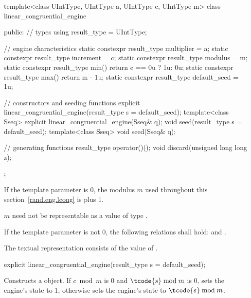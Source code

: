 %
\begin{codeblock}
template<class UIntType, UIntType a, UIntType c, UIntType m>
 class linear_congruential_engine
{
public:
 // types
 using result_type = UIntType;

 // engine characteristics
 static constexpr result_type multiplier = a;
 static constexpr result_type increment = c;
 static constexpr result_type modulus = m;
 static constexpr result_type min() { return c == 0u ? 1u: 0u; }
 static constexpr result_type max() { return m - 1u; }
 static constexpr result_type default_seed = 1u;

 // constructors and seeding functions
 explicit linear_congruential_engine(result_type s = default_seed);
 template<class Sseq> explicit linear_congruential_engine(Sseq& q);
 void seed(result_type s = default_seed);
 template<class Sseq> void seed(Sseq& q);

 // generating functions
 result_type operator()();
 void discard(unsigned long long z);
};
\end{codeblock}

\pnum
If the template parameter
 is $0$,
the modulus $m$
used throughout this section~\ref{rand.eng.lcong}
is  plus $1$.
\begin{note}
 $m$ need not be representable
 as a value of type .
\end{note}

\pnum
If the template parameter
 is not $0$,
the following relations shall hold:
and
  .

\pnum The textual representation%
consists of
the value of .

%
\begin{itemdecl}
explicit linear_congruential_engine(result_type s = default_seed);
\end{itemdecl}

\begin{itemdescr}
\pnum\effects Constructs a  object.
 If $ c \bmod m $ is $0$ and $ \tcode{s} \bmod m $ is $0$,
 sets the engine's state to $1$,
 otherwise sets the engine's state to $\tcode{s} \bmod m$.
\end{itemdescr}


